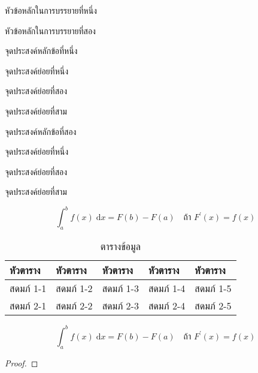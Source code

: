 \begin{preview}
	\item หัวข้อหลักในการบรรยายที่หนึ่ง
	\item หัวข้อหลักในการบรรยายที่สอง
\end{preview}
\begin{objective}
\item จุดประสงค์หลักข้อที่หนึ่ง
		\begin{subobjective}
			\item จุดประสงค์ย่อยที่หนึ่ง
			\item จุดประสงค์ย่อยที่สอง
			\item จุดประสงค์ย่อยที่สาม
		\end{subobjective}
\item จุดประสงค์หลักข้อที่สอง
		\begin{subobjective}
			\item จุดประสงค์ย่อยที่หนึ่ง
			\item จุดประสงค์ย่อยที่สอง
			\item จุดประสงค์ย่อยที่สาม
		\end{subobjective}
\end{objective}
\begin{content}
\begin{equation}
	\int_{a}^{b} f(x) \;\mathrm{d}x = F(b) - F(a) \quad\text{ถ้า }F^\prime(x) = f(x)
\end{equation}

\begin{table}[h]
\centering
\begin{tabular}{|l|l|l|l|l|}
\hline
หัวตาราง & หัวตาราง & หัวตาราง & หัวตาราง & หัวตาราง \\ \hline
สดมภ์ 1-1 & สดมภ์ 1-2 & สดมภ์ 1-3 & สดมภ์ 1-4 & สดมภ์ 1-5  \\ \hline 	
สดมภ์ 2-1 & สดมภ์ 2-2 & สดมภ์ 2-3 & สดมภ์ 2-4 & สดมภ์ 2-5  \\ \hline 
\end{tabular}
\caption{ตารางข้อมูล}	
\end{table}

\begin{theorem}
\begin{equation}
	\int_{a}^{b} f(x) \;\mathrm{d}x = F(b) - F(a) \quad\text{ถ้า }F^\prime(x) = f(x)
\end{equation}
\end{theorem}
\begin{proof}
\end{proof}

\begin{example}
\end{example}

\end{content}

